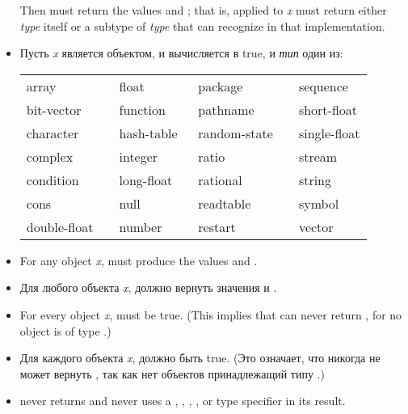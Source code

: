 \begin{defun}[Function]
\begin{new}
\begin{itemize}
Then
must return the values  and ; that is,  applied
to \textit{x} must return either \textit{type} itself or a subtype of \textit{type}
that  can recognize in that implementation.

\item
Пусть \textit{x} является объектом, и 
вычисляется в true, и \textit{тип} один из:

\begin{flushleft}
\cf
\begin{tabular}{@{}llll@{}}
array          & float        & package        & sequence \\
bit-vector     & function     & pathname       & short-float \\
character      & hash-table   & random-state~~ & single-float \\
complex        & integer      & ratio          & stream \\
condition      & long-float~~ & rational       & string \\
cons           & null         & readtable      & symbol \\
double-float~~ & number       & restart        & vector
\end{tabular}
\end{flushleft}

\item
For any object \textit{x}, 
must produce the values  and .

\item
Для любого объекта \textit{x}, 
должно вернуть значения  и .

\item
For every object \textit{x}, 
must be true.  (This implies that  can never return ,
for no object is of type .)

\item
Для каждого объекта \textit{x}, 
должно быть true. (Это означает, что  никогда не может вернуть
, так как нет объектов принадлежащий типу .)

\item
{} never returns  and never uses
a , , , ,
or  type specifier in its result.


\end{itemize}
\end{new}
\end{defun}
